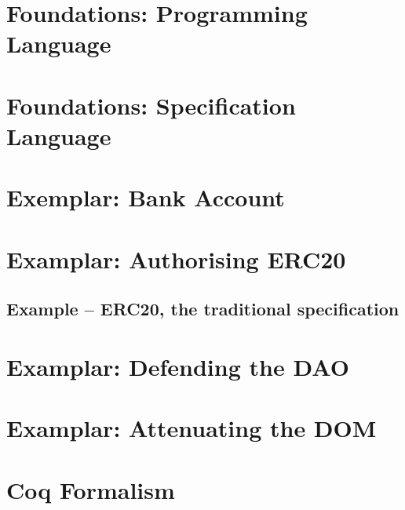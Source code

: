 \documentclass[runningheads]{llncs}
\begin{document}
\section{Foundations: Programming Language}
\label{app:LangOO}


\clearpage

\section{Foundations: Specification Language}
\label{app:assertions}


\clearpage

\section{Exemplar: Bank Account}
\label{Bank:appendix}


\clearpage

\section{Examplar: Authorising ERC20}
\label{sect:example:ERC20}
{}

\clearpage

\subsection{Example -- ERC20, the traditional specification }
\label{ERC20:appendix}


\clearpage

\section{Examplar: Defending the DAO}
\label{Dao:appendix}


\clearpage

\section{Examplar: Attenuating the DOM}
\label{sect:example:DOM}


\clearpage

\section{Coq Formalism}
\label{sect:coq}


\end{document}
